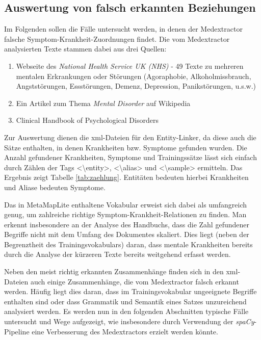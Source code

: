 \subsection{Auswertung von falsch erkannten Beziehungen}
\label{subsec:detaillierteAuswertung} 

Im Folgenden sollen die Fälle untersucht werden, in denen der Medextractor falsche Symptom-Krankheit-Zuordnungen findet. Die vom Medextractor analysierten Texte stammen dabei aus drei Quellen:

\begin{enumerate}
	\item Webseite des \emph{National Health Service UK (NHS)} - 49 Texte zu mehreren mentalen Erkrankungen oder Störungen (Agoraphobie, Alkoholmissbrauch, Angststörungen, Essstörungen, Demenz, Depression, Panikstörungen, u.s.w.) \cite{nhs_webpage}
	\item Ein Artikel zum Thema \emph{Mental Disorder} auf Wikipedia \cite{wikimentaldisorder}
	\item Clinical Handbook of Psychological Disorders \cite{clinicalhandbook}
\end{enumerate}

Zur Auswertung dienen die xml-Dateien für den Entity-Linker, da diese auch die Sätze enthalten, in denen Krankheiten bzw. Symptome gefunden wurden. Die Anzahl gefundener Krankheiten, Symptome und Trainingssätze lässt sich einfach durch Zählen der Tags <\textbackslash entity>, <\textbackslash alias> und <\textbackslash sample> ermitteln. Das Ergebnis zeigt Tabelle \ref{tab:zaehlung}. Entitäten bedeuten hierbei Krankheiten und Aliase bedeuten Symptome.

Das in MetaMapLite enthaltene Vokabular erweist sich dabei als umfangreich genug, um zahlreiche richtige Symptom-Krankheit-Relationen zu finden. Man erkennt insbesondere an der Analyse des Handbuchs, dass die Zahl gefundener Begriffe nicht mit dem Umfang des Dokumentes skaliert. Dies liegt (neben der Begrenztheit des Trainingsvokabulars) daran, dass mentale Krankheiten bereits durch die Analyse der kürzeren Texte bereits weitgehend erfasst werden.

Neben den meist richtig erkannten Zusammenhänge finden sich in den xml-Dateien auch einige Zusammenhänge, die vom Medextractor falsch erkannt werden. Häufig liegt dies daran, dass im Trainingsvokabular ungeeignete Begriffe enthalten sind oder dass Grammatik und Semantik eines Satzes unzureichend analysiert werden. Es werden nun in den folgenden Abschnitten typische Fälle untersucht und Wege aufgezeigt, wie insbesondere durch Verwendung der \emph{spaCy}-Pipeline eine Verbesserung des Medextractors erzielt werden könnte.

